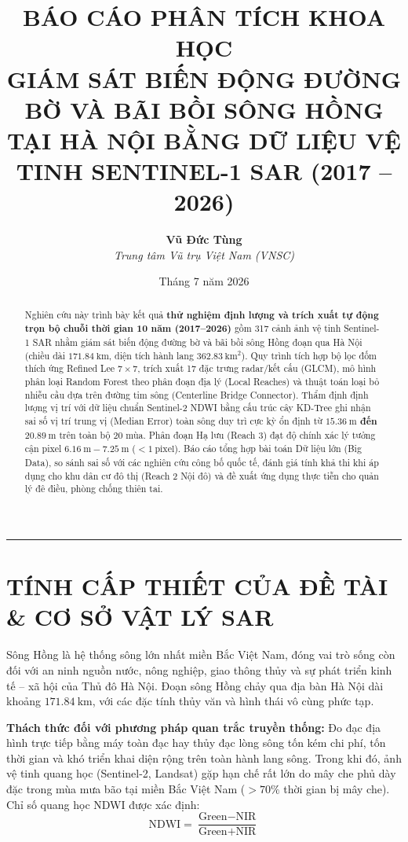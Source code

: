 \documentclass[11pt,a4paper]{article}
\title{\textbf{\LARGE BÁO CÁO PHÂN TÍCH KHOA HỌC}\\[0.3em]
\Large GIÁM SÁT BIẾN ĐỘNG ĐƯỜNG BỜ VÀ BÃI BỒI SÔNG HỒNG TẠI HÀ NỘI BẰNG DỮ LIỆU VỆ TINH SENTINEL-1 SAR (2017 -- 2026)}
\author{\textbf{Vũ Đức Tùng}\\[0.2em]
\small \textit{Trung tâm Vũ trụ Việt Nam (VNSC)}}
\date{\small Tháng 7 năm 2026}
\begin{document}
\maketitle

\begin{abstract}
Nghiên cứu này trình bày kết quả \textbf{thử nghiệm định lượng và trích xuất tự động trọn bộ chuỗi thời gian 10 năm (2017--2026)} gồm 317 cảnh ảnh vệ tinh Sentinel-1 SAR nhằm giám sát biến động đường bờ và bãi bồi sông Hồng đoạn qua Hà Nội (chiều dài $171.84~\text{km}$, diện tích hành lang $362.83~\text{km}^2$). Quy trình tích hợp bộ lọc đốm thích ứng Refined Lee $7\times7$, trích xuất 17 đặc trưng radar/kết cấu (GLCM), mô hình phân loại Random Forest theo phân đoạn địa lý (Local Reaches) và thuật toán loại bỏ nhiễu cầu dựa trên đường tim sông (Centerline Bridge Connector). Thẩm định định lượng vị trí với dữ liệu chuẩn Sentinel-2 NDWI bằng cấu trúc cây KD-Tree ghi nhận sai số vị trí trung vị (Median Error) toàn sông duy trì cực kỳ ổn định từ \textbf{$15.36~\text{m}$ đến $20.89~\text{m}$} trên toàn bộ 20 mùa. Phân đoạn Hạ lưu (Reach 3) đạt độ chính xác lý tưởng cận pixel \textbf{$6.16~\text{m} - 7.25~\text{m}$} ($< 1~\text{pixel}$). Báo cáo tổng hợp bài toán Dữ liệu lớn (Big Data), so sánh sai số với các nghiên cứu công bố quốc tế, đánh giá tính khả thi khi áp dụng cho khu dân cư đô thị (Reach 2 Nội đô) và đề xuất ứng dụng thực tiễn cho quản lý đê điều, phòng chống thiên tai.
\end{abstract}

\hrule
\vspace{1em}

\section{TÍNH CẤP THIẾT CỦA ĐỀ TÀI \& CƠ SỞ VẬT LÝ SAR}

Sông Hồng là hệ thống sông lớn nhất miền Bắc Việt Nam, đóng vai trò sống còn đối với an ninh nguồn nước, nông nghiệp, giao thông thủy và sự phát triển kinh tế -- xã hội của Thủ đô Hà Nội. Đoạn sông Hồng chảy qua địa bàn Hà Nội dài khoảng $171.84~\text{km}$, với các đặc tính thủy văn và hình thái vô cùng phức tạp.

\textbf{Thách thức đối với phương pháp quan trắc truyền thống:} Đo đạc địa hình trực tiếp bằng máy toàn đạc hay thủy đạc lòng sông tốn kém chi phí, tốn thời gian và khó triển khai diện rộng trên toàn hành lang sông. Trong khi đó, ảnh vệ tinh quang học (Sentinel-2, Landsat) gặp hạn chế rất lớn do mây che phủ dày đặc trong mùa mưa bão tại miền Bắc Việt Nam ($> 70\%$ thời gian bị mây che). Chỉ số quang học NDWI được xác định:
\begin{equation}
\text{NDWI} = \frac{\text{Green} - \text{NIR}}{\text{Green} + \text{NIR}}
\end{equation}
\end{document}
